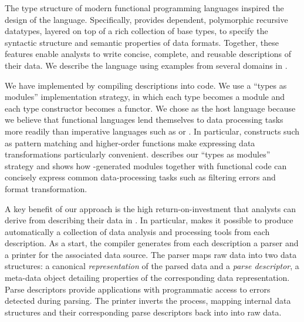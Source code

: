 
The type structure of modern functional programming languages inspired the design of the \padsml{} language.  
Specifically, \padsml{} provides dependent, polymorphic recursive datatypes, layered on top of a rich collection of base types, to specify the syntactic structure and semantic properties of data
formats.  Together, these features enable analysts to write concise,
complete, and reusable descriptions of their data.  
We describe the \padsml{} language using examples from several domains
in .


We have implemented \padsml{} by compiling descriptions into
\ocaml{} code.  We use a
``types as modules'' implementation strategy, in which each \padsml{} type
becomes a module and each \padsml{} type constructor becomes a functor. 
We chose \ml{} as the host language because we believe that 
functional languages lend themselves to data processing tasks more readily than imperative languages such as \C{} or \java{}.  In particular, constructs such as pattern matching and higher-order functions make expressing data transformations particularly convenient.  describes our ``types as modules''
strategy and shows how \padsml{}-generated modules together
with functional \ocaml{} code can concisely express
common
data-processing tasks such as filtering errors and format transformation.



A key benefit of our approach is the high return-on-investment that
analysts can derive from describing their data in \padsml{}.  In particular, \padsml{} makes it possible to produce automatically a collection of data analysis and processing tools from each description.   
As a start, the \padsml{} compiler generates from each description a parser and a printer for the associated data source.  The parser maps raw 
data into two data
structures: a canonical \textit{representation} of the parsed data and
a \textit{parse descriptor}, a meta-data object detailing properties
of the corresponding data representation.  Parse descriptors provide
applications with programmatic access to errors detected during
parsing.  The printer inverts the process, mapping internal data structures
and their corresponding parse descriptors back into into raw data.


